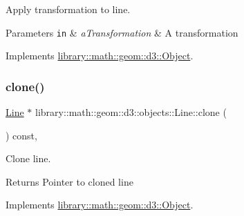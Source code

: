 Apply transformation to line. 


\begin{DoxyParams}[1]{Parameters}
\mbox{\tt in}  & {\em a\+Transformation} & A transformation \\
\hline
\end{DoxyParams}


Implements \hyperlink{classlibrary_1_1math_1_1geom_1_1d3_1_1_object_a5fc47b1ee5d9a28efc6010d3d1512470}{library\+::math\+::geom\+::d3\+::\+Object}.

\mbox{\label{classlibrary_1_1math_1_1geom_1_1d3_1_1objects_1_1_line_a55382b24007bccdae721176d0f73536f}} 
\subsubsection{\texorpdfstring{clone()}{clone()}}
{\footnotesize\ttfamily \hyperlink{classlibrary_1_1math_1_1geom_1_1d3_1_1objects_1_1_line}{Line} $\ast$ library\+::math\+::geom\+::d3\+::objects\+::\+Line\+::clone (\begin{DoxyParamCaption}{ }\end{DoxyParamCaption}) const\hspace{0.3cm}{\ttfamily [override]}, {\ttfamily [virtual]}}



Clone line. 

\begin{DoxyReturn}{Returns}
Pointer to cloned line 
\end{DoxyReturn}


Implements \hyperlink{classlibrary_1_1math_1_1geom_1_1d3_1_1_object_a1a784c6b359e0eb97cd34fabc42f2f3f}{library\+::math\+::geom\+::d3\+::\+Object}.

\mbox{\label{classlibrary_1_1math_1_1geom_1_1d3_1_1objects_1_1_line_a59b72a3a39134963f5165a03829b17aa}} 
